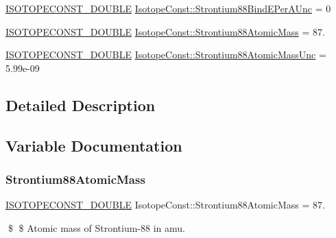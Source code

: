 \begin{DoxyCompactItemize}
\mbox{\hyperlink{group___isotope_const-_macros_ga8f45a7272ce02c0b4c65c44636ed719a}{I\+S\+O\+T\+O\+P\+E\+C\+O\+N\+S\+T\+\_\+\+D\+O\+U\+B\+LE}} \mbox{\hyperlink{group___isotope_const-_strontium-_sr88_gad9e756de81210a21abb843d3c266f0e0}{Isotope\+Const\+::\+Strontium88\+Bind\+E\+Per\+A\+Unc}} = 0
\item 
\mbox{\hyperlink{group___isotope_const-_macros_ga8f45a7272ce02c0b4c65c44636ed719a}{I\+S\+O\+T\+O\+P\+E\+C\+O\+N\+S\+T\+\_\+\+D\+O\+U\+B\+LE}} \mbox{\hyperlink{group___isotope_const-_strontium-_sr88_ga5164a6b88b38310d132990e083cca2ac}{Isotope\+Const\+::\+Strontium88\+Atomic\+Mass}} = 87.
\item 
\mbox{\hyperlink{group___isotope_const-_macros_ga8f45a7272ce02c0b4c65c44636ed719a}{I\+S\+O\+T\+O\+P\+E\+C\+O\+N\+S\+T\+\_\+\+D\+O\+U\+B\+LE}} \mbox{\hyperlink{group___isotope_const-_strontium-_sr88_ga1166df488e70b3330f5114d3cf1aa9d0}{Isotope\+Const\+::\+Strontium88\+Atomic\+Mass\+Unc}} = 5.\+99e-\/09
\end{DoxyCompactItemize}


\subsection{Detailed Description}


\subsection{Variable Documentation}
\mbox{\label{group___isotope_const-_strontium-_sr88_ga5164a6b88b38310d132990e083cca2ac}} 
\subsubsection{\texorpdfstring{Strontium88\+Atomic\+Mass}{Strontium88AtomicMass}}
{\footnotesize\ttfamily \mbox{\hyperlink{group___isotope_const-_macros_ga8f45a7272ce02c0b4c65c44636ed719a}{I\+S\+O\+T\+O\+P\+E\+C\+O\+N\+S\+T\+\_\+\+D\+O\+U\+B\+LE}} Isotope\+Const\+::\+Strontium88\+Atomic\+Mass = 87.}

\$ \$ Atomic mass of Strontium-\/88 in amu. \mbox{\label{group___isotope_const-_strontium-_sr88_ga1166df488e70b3330f5114d3cf1aa9d0}} 
